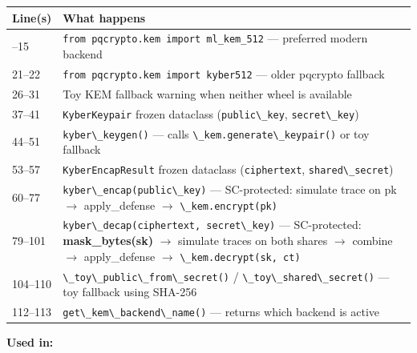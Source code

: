 \documentclass[11pt,a4paper]{article}
\newcommand{\code}[1]{\lstinline[basicstyle=\ttfamily\small]!#1!}
\begin{document}
\begin{longtable}{L{2.2cm} L{11.5cm}}
\toprule
\textbf{Line(s)} & \textbf{What happens} \\
\midrule
\endhead
\bottomrule
{}--15  & \code{from pqcrypto.kem import ml_kem_512} --- preferred modern backend \\
21--22  & \code{from pqcrypto.kem import kyber512} --- older pqcrypto fallback \\
26--31  & Toy KEM fallback warning when neither wheel is available \\
37--41  & \code{KyberKeypair} frozen dataclass (\code{public\_key}, \code{secret\_key}) \\
44--51  & \code{kyber\_keygen()} --- calls \code{\_kem.generate\_keypair()} or toy fallback \\
53--57  & \code{KyberEncapResult} frozen dataclass (\code{ciphertext}, \code{shared\_secret}) \\
60--77  & \code{kyber\_encap(public\_key)} --- SC-protected: simulate trace on pk $\to$ apply\_defense $\to$ \code{\_kem.encrypt(pk)} \\
79--101 & \code{kyber\_decap(ciphertext, secret\_key)} --- SC-protected: \textbf{mask\_bytes(sk)} $\to$ simulate traces on both shares $\to$ combine $\to$ apply\_defense $\to$ \code{\_kem.decrypt(sk, ct)} \\
104--110 & \code{\_toy\_public\_from\_secret()} / \code{\_toy\_shared\_secret()} --- toy fallback using SHA-256 \\
112--113 & \code{get\_kem\_backend\_name()} --- returns which backend is active \\
\end{longtable}

\textbf{Used in:}
\end{document}
